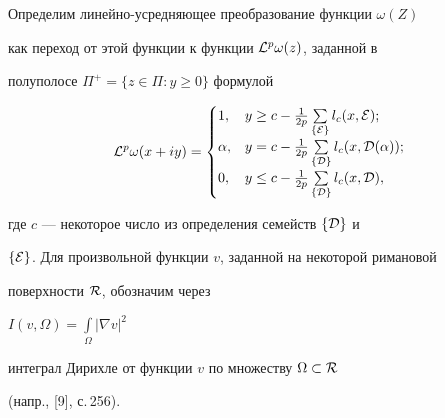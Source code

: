 Определим линейно-усредняющее преобразование функции $\omega(Z)$


как переход от этой функции к функции ${\cal L}^p\omega(z)$, заданной в


полуполосе $\Pi^+=\{z\in\Pi: y\geq 0\}$ формулой


$$


{\cal L}^p\omega(x+iy)=


\begin{cases}


1, &y\ge c-\frac{1}{2p}\sum\limits_{\{{\cal E}\}}l_c(x,{\cal E});\\


\alpha, &y=c-\frac{1}{2p}\sum\limits_{\{{\cal D}\}}l_c(x,{\cal D}(\alpha));\\


0, &y\leq c-\frac{1}{2p}\sum\limits_{\{{\cal D}\}}l_c(x,{\cal D}),\\


\end{cases}


$$


где $c$ --- некоторое число из определения семейств $\{{\cal D}\}$ и


$\{{\cal E}\}$. Для произвольной функции $v$, заданной на некоторой римановой


поверхности ${{\cal R}}$, обозначим через


$I(v,\Omega)=\int\limits_{\Omega}|\nabla v|^2$


интеграл Дирихле от функции $v$ по множеству $\Omega \subset {\cal R}$


(напр., [9], с.\,256).





